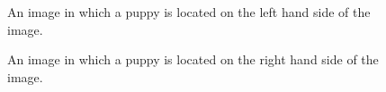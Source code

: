 \documentclass[a4paper]{article}
\begin{document}
\vspace{0.25cm}

\begin{figure}[h]
\begin{minipage}{0.45\textwidth}
\centering
{}
\caption{An image in which a puppy is located on the left hand side of the image.}
\end{minipage}
\hspace{1cm}
\begin{minipage}{0.45\textwidth}
\centering
{}
\caption{An image in which a puppy is located on the right hand side of the image.}
\end{minipage}
\end{figure}

\newpage
\end{document}
